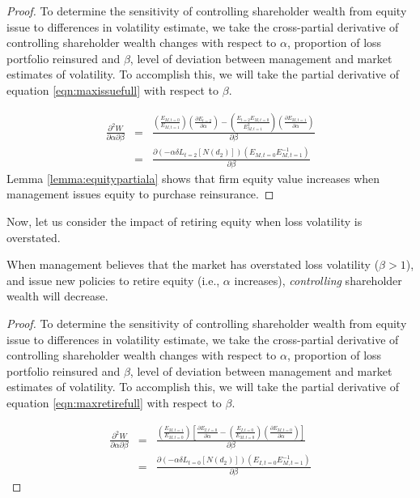 \begin{proof}
To determine the sensitivity of controlling shareholder wealth from equity issue to differences in volatility estimate, we take the cross-partial derivative of controlling shareholder wealth changes with respect to $\alpha$, proportion of loss portfolio reinsured and $\beta$, level of deviation between management and market estimates of volatility.  To accomplish this, we will take the partial derivative of equation \ref{eqn:maxissuefull} with respect to $\beta$.

\begin{eqnarray}\label{eqn:betahigh}
\frac{\partial ^2 W}{\partial \alpha \partial \beta}&=&\frac{\left(\frac{E_{M,t=0}}{E_{M,t=1}}\right)\left(\frac{\partial E_{t=2}}{\partial \alpha}\right)-\left(\frac{E_{t=2}E_{M,t=0}}{E^2_{M,t=1}}\right)\left(\frac{\partial E_{M,t=1}}{\partial \alpha}\right)}{\partial \beta}\nonumber \\
&=&\frac{\partial \left(-\alpha \delta L_{t=2} \left[N\left(d_2\right)\right]\right)\left(E_{M,t=0}E_{M,t=1}^{-1}\right)}{\partial \beta}
\end{eqnarray}
Lemma \ref{lemma:equitypartiala} shows that firm equity value increases when management issues equity to purchase reinsurance.

\end{proof}

Now, let us consider the impact of retiring equity when loss volatility is overstated.

\begin{proposition}
When management believes that the market has overstated loss volatility ($\beta>1$), and issue new policies to retire equity (i.e., $\alpha$ increases), \textit{controlling} shareholder wealth will decrease.
\end{proposition}

\begin{proof}
To determine the sensitivity of controlling shareholder wealth from equity issue to differences in volatility estimate, we take the cross-partial derivative of controlling shareholder wealth changes with respect to $\alpha$, proportion of loss portfolio reinsured and $\beta$, level of deviation between management and market estimates of volatility.  To accomplish this, we will take the partial derivative of equation \ref{eqn:maxretirefull} with respect to $\beta$.

\begin{eqnarray}\label{eqn:betalow}
\frac{\partial ^2 W}{\partial \alpha \partial \beta}&=&\frac{\left(\frac{E_{M,t=1}}{E_{M,t=0}}\right)\left[\frac{\partial E_{I,t=0}}{\partial \alpha}-\left(\frac{E_{I,t=0}}{E_{M,t=0}}\right)\left(\frac{\partial E_{M,t=0}}{\partial \alpha}\right)\right]}{\partial \beta}\nonumber \\
&=&\frac{\partial \left(-\alpha \delta L_{t=0} \left[N\left(d_2\right)\right]\right)\left(E_{I,t=0}E_{M,t=1}^{-1}\right)}{\partial \beta}
\end{eqnarray}

\end{proof}

